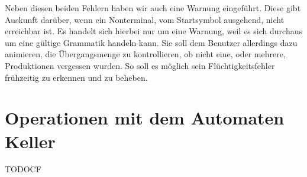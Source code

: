 Neben diesen beiden Fehlern haben wir auch eine Warnung eingeführt. Diese
gibt Auskunft darüber, wenn ein Nonterminal, vom Startsymbol ausgehend,
nicht erreichbar ist. Es handelt sich hierbei nur um eine Warnung, weil es
sich durchaus um eine gültige Grammatik handeln kann. Sie soll dem Benutzer
allerdings dazu animieren, die Übergangsmenge zu kontrollieren, ob nicht eine,
oder mehrere, Produktionen vergessen wurden. So soll es möglich sein
Flüchtigkeitsfehler frühzeitig zu erkennen und zu beheben.


\section{Operationen mit dem Automaten Keller}

TODOCF